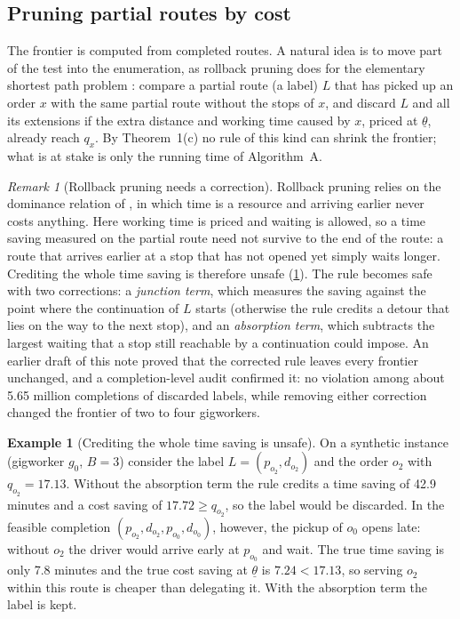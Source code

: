 \documentclass[11pt]{article}
\theoremstyle{definition}
\newtheorem{example}{Example}
\theoremstyle{remark}
\newtheorem{remark}{Remark}
\newcommand{\thl}{\underline{\theta}}
\begin{document}
\subsection{Pruning partial routes by cost}
\label{sec:rollback}

The frontier is computed from completed routes. A natural idea is to move
part of the test into the enumeration, as rollback pruning does for the
elementary shortest path problem \citep{lozano2016exact}: compare a partial
route (a label) $L$ that has picked up an order $x$ with the same partial
route without the stops of $x$, and discard $L$ and all its extensions if the
extra distance and working time caused by $x$, priced at $\thl$, already reach
$q_x$. By Theorem~1(c) no rule of this kind can shrink the frontier; what is
at stake is only the running time of Algorithm~A.

\begin{remark}[Rollback pruning needs a correction]\label{rem:rollback}
Rollback pruning relies on the dominance relation of \citet{feillet2004exact},
in which time is a resource and arriving earlier never costs anything. Here
working time is priced and waiting is allowed, so a time saving measured on
the partial route need not survive to the end of the route: a route that
arrives earlier at a stop that has not opened yet simply waits longer.
Crediting the whole time saving is therefore unsafe (\cref{ex:rollback}). The
rule becomes safe with two corrections: a \emph{junction term}, which measures
the saving against the point where the continuation of $L$ starts (otherwise
the rule credits a detour that lies on the way to the next stop), and an
\emph{absorption term}, which subtracts the largest waiting that a stop still
reachable by a continuation could impose. An earlier draft of this note
proved that the corrected rule leaves every frontier unchanged, and a
completion-level audit confirmed it: no violation among about 5.65 million
completions of discarded labels, while removing either correction changed the
frontier of two to four gigworkers.
\end{remark}

\begin{example}[Crediting the whole time saving is unsafe]\label{ex:rollback}
On a synthetic instance (gigworker $g_0$, $B=3$) consider the label
$L=(p_{o_2},d_{o_2})$ and the order $o_2$ with $q_{o_2}=17.13$. Without the
absorption term the rule credits a time saving of 42.9 minutes and a cost
saving of $17.72\ge q_{o_2}$, so the label would be discarded. In the feasible
completion $(p_{o_2},d_{o_2},p_{o_0},d_{o_0})$, however, the pickup of $o_0$
opens late: without $o_2$ the driver would arrive early at $p_{o_0}$ and wait.
The true time saving is only 7.8 minutes and the true cost saving at $\thl$ is
$7.24<17.13$, so serving $o_2$ within this route is cheaper than delegating it.
With the absorption term the label is kept.
\end{example}
\end{document}
